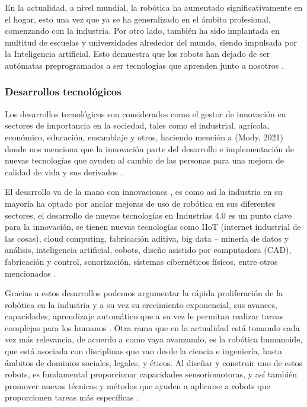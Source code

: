\documentclass[conference]{IEEEtran}
\begin{document}
En la actualidad, a nivel mundial, la robótica ha aumentado significativamente en el hogar, esto una vez que ya se ha generalizado en el ámbito profesional, comenzando con la industria. Por otro lado, también ha sido implantada en multitud de escuelas y universidades alrededor del mundo, siendo impulsada por la Inteligencia artificial. Esto demuestra que los robots han dejado de ser autómatas preprogramados a ser tecnologías que aprenden junto a nosotros \cite{Castro2018}.

\subsubsection{Desarrollos tecnológicos}

Los desarrollos tecnológicos son considerados como el gestor de innovación en sectores de importancia en la sociedad, tales como el industrial, agrícola, económico, educación, ensamblaje y otros, haciendo mención a (Mody, 2021) donde nos menciona que la innovación parte del desarrollo e implementación de nuevas tecnologías que ayuden al cambio de las personas para una mejora de calidad de vida y sus derivados \cite{Mody2021}.

El desarrollo va de la mano con innovaciones \cite{Malerba2020}, es como así la industria en su mayoría ha optado por anclar mejoras de uso de robótica en sus diferentes sectores, el desarrollo de nuevas tecnologías en Industrias 4.0 es un punto clave para la innovación, se tienen nuevas tecnologías como IIoT (internet industrial de las cosas), cloud computing, fabricación aditiva, big data – minería de datos y análisis, inteligencia artificial, cobots, diseño asistido por computadora (CAD), fabricación y control, sonorización, sistemas cibernéticos físicos, entre otros mencionados \cite{Sharma2020}.

Gracias a estos desarrollos podemos argumentar la rápida proliferación de la robótica en la industria y a su vez su crecimiento exponencial, sus avances, capacidades, aprendizaje automático que a su vez le permitan realizar tareas complejas para los humanos \cite{Backer2018}.
Otra rama que en la actualidad está tomando cada vez más relevancia, de acuerdo a como vaya avanzando, es la robótica humanoide, que está asociada con disciplinas que van desde la ciencia e ingeniería, hasta ámbitos de dominios sociales, legales, y éticos. Al diseñar y construir uno de estos robots, es fundamental proporcionar capacidades sensoriomotoras, y así también promover nuevas técnicas y métodos que ayuden a aplicarse a robots que proporcionen tareas más específicas \cite{Fukuda2017}.
\end{document}

